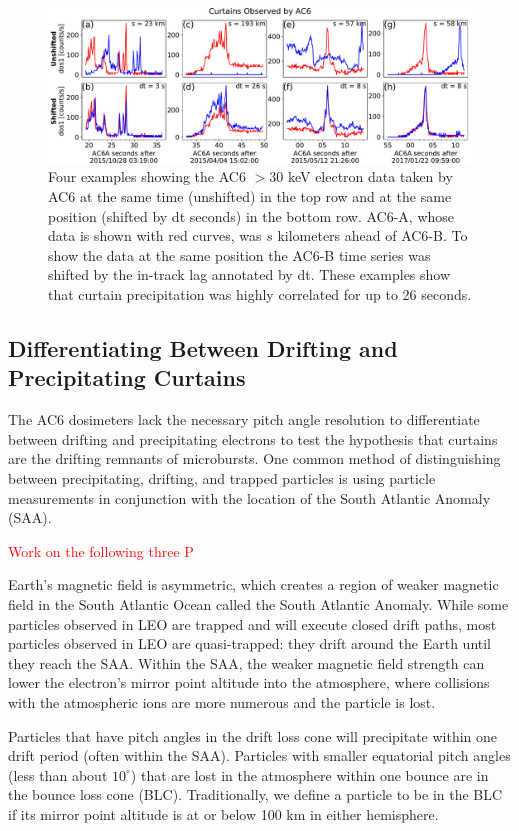 \documentclass[draft]{agujournal2019}
\begin{document}
\begin{figure}
\includegraphics[width=\textwidth]{fig1.pdf}
\caption{Four examples showing the AC6 $> 30$ keV electron data taken by AC6 at the same time (unshifted) in the top row and at the same position (shifted by dt seconds) in the bottom row. AC6-A, whose data is shown with red curves, was $s$ kilometers ahead of AC6-B. To show the data at the same position the AC6-B time series was shifted by the in-track lag annotated by dt. These examples show that curtain precipitation was highly correlated for up to 26 seconds.}
\label{fig1}
\end{figure}

\subsection{Differentiating Between Drifting and Precipitating Curtains}

The AC6 dosimeters lack the necessary pitch angle resolution to differentiate between drifting and precipitating electrons to test the  hypothesis that curtains are the drifting remnants of microbursts. One common method of distinguishing between precipitating, drifting, and trapped particles is using particle measurements in conjunction with the location of the South Atlantic Anomaly (SAA).

\textcolor{red}{Work on the following three P}

Earth's magnetic field is asymmetric, which creates a region of weaker magnetic field in the South Atlantic Ocean called the South Atlantic Anomaly. 
While some particles observed in LEO are trapped and will execute closed drift paths, most particles observed in LEO are quasi-trapped: they drift around the Earth until they reach the SAA. Within the SAA, the weaker magnetic field strength can lower the electron's mirror point altitude into the atmosphere, where collisions with the atmospheric ions are more numerous and the particle is lost. 

Particles that have pitch angles in the drift loss cone will precipitate within one drift period (often within the SAA). Particles with smaller equatorial pitch angles (less than about $10^\circ$) that are lost in the atmosphere within one bounce are in the bounce loss cone (BLC). Traditionally, we define a particle to be in the BLC if its mirror point altitude is at or below 100 km in either hemisphere.
\end{document}
